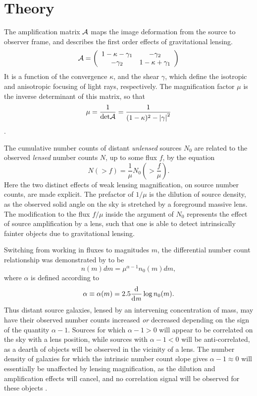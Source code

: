 \section{Theory}
\label{theory}
The amplification matrix $\cal{A}$ maps the image deformation from the source to observer frame, and describes the first order effects of gravitational lensing.  
\begin{equation}
\cal{A} = \left( \begin{array}{cc}
{1-\kappa-\gamma_1} & {-\gamma_2} \\
{-\gamma_2} & {1-\kappa+\gamma_1} \\
\end{array} \right) 
\end{equation}
It is a function of the convergence $\kappa$, and the shear $\gamma$, which define the isotropic and anisotropic focusing of light rays, respectively.  The magnification factor $\mu$ is the inverse determinant of this matrix, so that
\begin{equation}
\mu = \frac{1}{\mathrm{det} \cal{A}} = 
\frac{1}{(1-\kappa)^2 - \left|\gamma\right|^2}
\end{equation}
\citep{BS01}.  

The cumulative number counts of distant {\it unlensed} sources $N_0$ are related to the observed {\it lensed} number counts $N$, up to some flux $f$, by the equation
\begin{equation}
N (>f) = \frac{1}{\mu} N_0 \left( > \frac{f}{\mu} \right).
\end{equation}
Here the two distinct effects of weak lensing magnification, on source number counts, are made explicit.  The prefactor of $1 / \mu$ is the dilution of source density, as the observed solid angle on the sky is stretched by a foreground massive lens.  The modification to the flux $f / \mu$ inside the argument of $N_0$ represents the effect of source amplification by a lens, such that one is able to detect intrinsically fainter objects due to gravitational lensing.

Switching from working in fluxes to magnitudes $m$, the differential number count relationship was demonstrated by \citet{Narayan89} to be
\begin{equation}
n(m)dm = \mu ^{\alpha -1} n_0 (m)dm,
\end{equation}
where $\alpha$ is defined according to
\begin{equation}
\alpha \equiv \alpha(m) = 2.5 \frac{\mathrm d}{\mathrm d \it m} \log n_0(m).
\end{equation}
Thus distant source galaxies, lensed by an intervening concentration of mass, may have their observed number counts increased {\it or} decreased depending on the sign of the quantity $\alpha -1$.  Sources for which $\alpha -1 > 0$ will appear to be correlated on the sky with a lens position, while sources with $\alpha -1 < 0$ will be anti-correlated, as a dearth of objects will be observed in the vicinity of a lens.  The number density of galaxies for which the intrinsic number count slope gives $\alpha -1 \approx 0$ will essentially be unaffected by lensing magnification, as the dilution and amplification effects will cancel, and no correlation signal will be observed for these objects \citep{Scranton05}.

